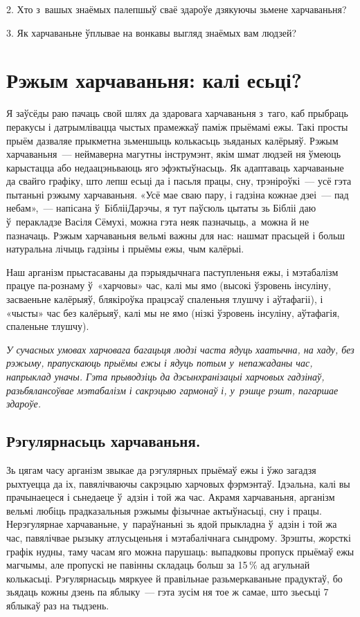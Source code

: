 2. Хто з~вашых знаёмых палепшыў сваё здароўе дзякуючы зьмене харчаваньня?

3. Як харчаваньне ўплывае на вонкавы выгляд знаёмых вам людзей?


\section{Рэжым харчаваньня: калі есьці?}

Я заўсёды раю пачаць свой шлях да здаровага харчаваньня з~таго, каб прыбраць перакусы і датрымлівацца чыстых прамежкаў паміж прыёмамі ежы. Такі просты прыём дазваляе прыкметна зьменшыць колькасьць зьяданых калёрыяў. Рэжым харчаваньня~--- неймаверна магутны інструмэнт, якім шмат людзей ня ўмеюць карыстацца або недаацэньваюць яго эфэктыўнасьць. Як адаптаваць харчаваньне да свайго графіку, што лепш есьці да і пасьля працы, сну, трэніроўкі~--- усё гэта пытаньні рэжыму харчаваньня. «Усё мае сваю пару, і гадзіна кожнае дзеі~--- пад небам»,~--- напісана ў~БіблііДарэчы, я тут паўсюль цытаты зь Бібліі даю ў~перакладзе Васіля Сёмухі, можна гэта неяк пазначыць, а~можна й не пазначаць. Рэжым харчаваньня вельмі важны для нас: нашмат прасьцей і больш натуральна лічыць гадзіны і прыёмы ежы, чым калёрыі. 


Наш арганізм прыстасаваны да пэрыядычнага паступленьня ежы, і мэтабалізм працуе па-рознаму ў~«харчовы» час, калі мы ямо (высокі ўзровень інсуліну, засваеньне калёрыяў, блякіроўка працэсаў спаленьня тлушчу і аўтафагіі), і «чысты» час без калёрыяў, калі мы не ямо (нізкі ўзровень інсуліну, аўтафагія, спаленьне тлушчу).

\emph{У сучасных умовах харчовага багацьця людзі часта ядуць хаатычна, на хаду, без рэжыму, прапускаюць прыёмы ежы і ядуць потым у~непажаданы час, напрыклад уначы. Гэта прыводзіць да дэсынхранізацыі харчовых гадзінаў, разьбялансоўвае мэтабалізм і сакрэцыю гармонаў і, у~рэшце рэшт, пагаршае здароўе.}

\subsection*{Рэгулярнасьць харчаваньня.} 
Зь цягам часу арганізм звыкае да рэгулярных прыёмаў ежы і ўжо загадзя рыхтуецца да іх, павялічваючы сакрэцыю харчовых фэрмэнтаў. Ідэальна, калі вы прачынаецеся і сьнедаеце ў~адзін і той жа час. Акрамя харчаваньня, арганізм вельмі любіць прадказальныя рэжымы фізычнае актыўнасьці, сну і працы. Нерэгулярнае харчаваньне, у~параўнаньні зь ядой прыкладна ў~адзін і той жа час, павялічвае рызыку атлусьценьня і мэтабалічнага сындрому. Зрэшты, жорсткі графік нудны, таму часам яго можна парушаць: выпадковы пропуск прыёмаў ежы магчымы, але пропускі не павінны складаць больш за 15\,\% ад агульнай колькасьці. Рэгулярнасьць мяркуее й правільнае разьмеркаваньне прадуктаў, бо зьядаць кожны дзень па яблыку~--- гэта зусім ня тое ж самае, што зьесьці 7 яблыкаў раз на тыдзень.

